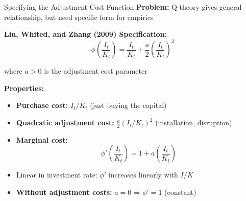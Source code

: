 \documentclass{beamer}
\begin{document}
\begin{frame}{Specifying the Adjustment Cost Function}
    \textbf{Problem:} Q-theory gives general relationship, but need specific form for empirics
    
    \vspace{0.2cm}
    \textbf{Liu, Whited, and Zhang (2009) Specification:}
    \begin{equation}\label{equ:lwz cost}
        \phi\left(\frac{I_t}{K_t}\right) = \frac{I_t}{K_t} + \frac{a}{2}\left(\frac{I_t}{K_t}\right)^2
    \end{equation}
    
    where $a > 0$ is the adjustment cost parameter
    
    
    \textbf{Properties:}
    \begin{itemize}
        \item \textbf{Purchase cost:} $I_t/K_t$ (just buying the capital)
        \item \textbf{Quadratic adjustment cost:} $\frac{a}{2}(I_t/K_t)^2$ (installation, disruption)
        \item \textbf{Marginal cost:}
        \begin{equation}\label{equ:marginal cost}
            \phi'\left(\frac{I_t}{K_t}\right) = 1 + a\left(\frac{I_t}{K_t}\right)
        \end{equation}
        \item Linear in investment rate: $\phi'$ increases linearly with $I/K$
        \item \textbf{Without adjustment costs:} $a = 0 \Rightarrow \phi' = 1$ (constant)
    \end{itemize}
\end{frame}
\end{document}
